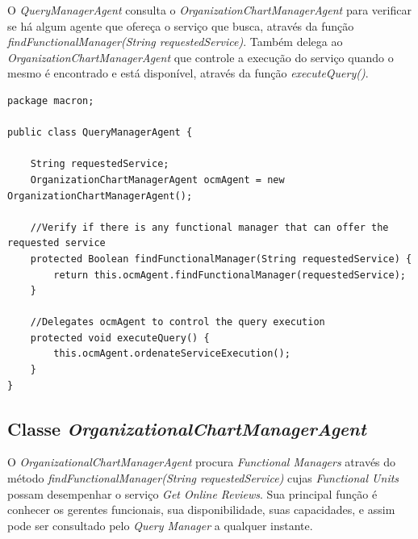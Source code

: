 O \textit{QueryManagerAgent} consulta o \textit{OrganizationChartManagerAgent} para verificar se há algum agente que ofereça o serviço que busca, através da função \textit{findFunctionalManager(String requestedService)}. Também delega ao \textit{OrganizationChartManagerAgent} que controle a execução do serviço quando o mesmo é encontrado e está disponível, através da função \textit{executeQuery()}. 

\begin{lstlisting}
package macron;

public class QueryManagerAgent {

	String requestedService;
	OrganizationChartManagerAgent ocmAgent = new OrganizationChartManagerAgent();
	
	//Verify if there is any functional manager that can offer the requested service
	protected Boolean findFunctionalManager(String requestedService) {
		return this.ocmAgent.findFunctionalManager(requestedService);
	}
	
	//Delegates ocmAgent to control the query execution
	protected void executeQuery() {
		this.ocmAgent.ordenateServiceExecution();
	}
}
\end{lstlisting}

\subsection{Classe \textit{OrganizationalChartManagerAgent}}

O \textit{OrganizationalChartManagerAgent} procura \textit{Functional Managers} através do método \textit{findFunctionalManager(String requestedService)} cujas \textit{Functional Units} possam desempenhar o serviço \textit{Get Online Reviews}. Sua principal função é conhecer os gerentes funcionais, sua disponibilidade, suas capacidades, e assim pode ser consultado pelo \textit{Query Manager} a qualquer instante. 

